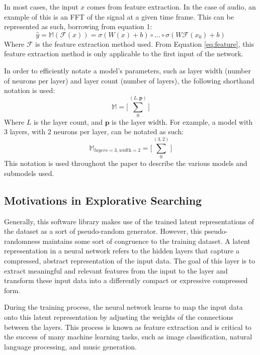 \documentclass{article}
\begin{document}
In most cases, the input $x$ comes from feature extraction. In the case of audio, an example of this is an FFT of the signal at a given time frame. This can be represented as such, borrowing from equation 1:
\begin{equation}
	\label{eq:feature}
	\hat{y} = \mathbb{M}(\mathcal{F}(x)) = \sigma(W(x)+b)\circ \dots \circ \sigma(W\mathcal{F}(x_0) + b)
\end{equation}
Where $\mathcal{F}$ is the feature extraction method used. From Equation \ref{eq:feature}, this feature extraction method is only applicable to the first input of the network.

In order to efficiently notate a model's parameters, such as layer width (number of neurons per layer) and layer count (number of layers), the following shorthand notation is used:
\begin{equation}
	\mathbb{M} = \Bigg[\sum^{(L,\mathbf{p})}_0\Bigg]
\end{equation}
Where $L$ is the layer count, and $\mathbf{p}$ is the layer width. For example, a model with 3 layers, with 2 neurons per layer, can be notated as such:
\begin{equation}
	\mathbb{M}_{\textit{layers}=3,\textit{width}=2}= \Bigg[\sum^{(3,2)}_0\Bigg]
\end{equation}
This notation is used throughout the paper to describe the various models and submodels used.
\subsection{Motivations in Explorative Searching}
Generally, this software library makes use of the trained latent representations of the dataset as a sort of pseudo-random generator. However, this pseudo-randomness maintains some sort of congruence to the training dataset. A latent representation in a neural network refers to the hidden layers that capture a compressed, abstract representation of the input data. The goal of this layer is to extract meaningful and relevant features from the input to the layer and transform these input data into a differently compact or expressive compressed form.

During the training process, the neural network learns to map the input data onto this latent representation by adjusting the weights of the connections between the layers. This process is known as feature extraction and is critical to the success of many machine learning tasks, such as image classification, natural language processing, and music generation.
\end{document}

